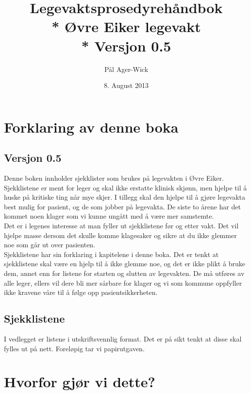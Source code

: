 \documentclass[12pt,a4paper]{memoir}
\author{Pål Ager-Wick }
\title {Legevaktsprosedyrehåndbok \\* Øvre Eiker legevakt \\* Versjon 0.5}
\date{8. August 2013}
\begin{document}
\renewcommand{\chaptername}{Del}
\renewcommand{\tablename}{Liste:}

\renewcommand{\bibname}{Kilder:}
\renewcommand{\contentsname}{Innhold:}
\renewcommand{\listfigurename}{Oversikt over bilder:}


  

\tableofcontents


\chapter{Forklaring av denne boka}
	\section{Versjon 0.5} \label{versjon}
	Denne boken innholder sjekklister som brukes på legevakten i Øvre Eiker. Sjekklistene er ment for leger og skal ikke erstatte klinisk skjønn, men hjelpe til å huske på kritiske ting når mye skjer. I tillegg skal den hjelpe til å gjøre legevakta best mulig for pasient, og de som jobber på legevakta. De siste to årene har det kommet noen klager som vi kunne ungått med å være mer samstemte. \\
	Det er i legenes interesse at man fyller ut sjekklistene før og etter vakt. Det vil hjelpe masse dersom det skulle komme klagesaker og sikre at du ikke glemmer noe som går ut over pasienten\cite{manifesto}.\\
	Sjekklistene har sin forklaring i kapitelene i denne boka. Det er tenkt at sjekklistene skal være en hjelp til å ikke glemme noe, og det er ikke plikt å bruke dem, annet enn for listene for starten og slutten av legevakten. De må utføres av alle leger, ellers vil dere bli mer sårbare for klager og vi som kommune oppfyller ikke kravene våre til å følge opp pasientsikkerheten. 

	\section{Sjekklistene}
	I vedlegget er listene i utskriftsvennlig format. Det er på sikt tenkt at disse skal fylles ut på nett. Foreløpig tar vi papirutgaven. 

\chapter{Hvorfor gjør vi dette?}\label{chap:desc_lv_start}
\end{document}
